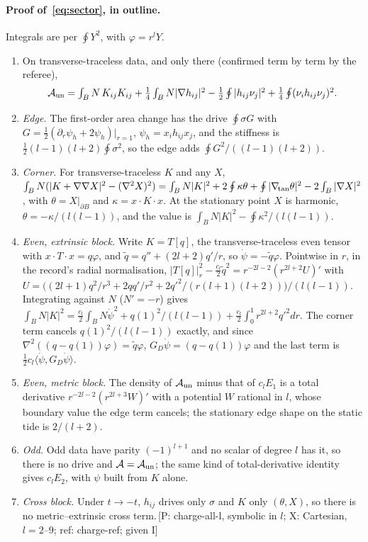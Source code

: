 \documentclass[11pt]{article}
\newcommand{\cA}{\mathcal{A}}
\newcommand{\GD}{G_{\!D}}
\newcommand{\ip}[2]{\langle #1,#2\rangle}
\newcommand{\ev}[1]{\,{\textsf{\scriptsize[#1]}}}
\begin{document}
\paragraph{Proof of~\eqref{eq:sector}, in outline.} Integrals are per $\oint Y^2$, with $\varphi=r^lY$.
\begin{enumerate}\itemsep0pt\setlength{\leftmargin}{1.6em}
\item[(i)] On transverse-traceless data, and only there (confirmed term by term by the referee),
\[\textstyle\cA_{\rm un}=\int_BN\,K_{ij}K_{ij}+\frac14\int_BN|\nabla h_{ij}|^2-\frac12\oint|h_{ij}\nu_j|^2+\frac14\oint(\nu_ih_{ij}\nu_j)^2.\]
\item[(ii)] \emph{Edge.} The first-order area change has the drive $\oint\sigma G$ with $G=\frac12(\partial_r\psi_h+2\psi_h)|_{r=1}$, $\psi_h=x_ih_{ij}x_j$, and the stiffness is $\frac12(l-1)(l+2)\oint\sigma^2$, so the edge adds $\oint G^2/((l-1)(l+2))$.
\item[(iii)] \emph{Corner.} For transverse-traceless $K$ and any $X$, $\int_BN(|K+\nabla\nabla X|^2-(\nabla^2X)^2)=\int_BN|K|^2+2\oint\kappa\theta+\oint|\nabla_{\!\rm tan}\theta|^2-2\int_B|\nabla X|^2$, with $\theta=X|_{\partial B}$ and $\kappa=x\!\cdot\!K\!\cdot\!x$. At the stationary point $X$ is harmonic, $\theta=-\kappa/(l(l-1))$, and the value is $\int_BN|K|^2-\oint\kappa^2/(l(l-1))$.
\item[(iv)] \emph{Even, extrinsic block.} Write $K=T[q]$, the transverse-traceless even tensor with $x\!\cdot\!T\!\cdot\!x=q\varphi$, and $\tilde q=q''+(2l+2)q'/r$, so $\dot\psi=-\tilde q\varphi$. Pointwise in $r$, in the record's radial normalisation, $|T[q]|^2_r-\frac{c_l}2\tilde q^2=r^{-2l-2}(r^{2l+2}U)'$ with $U=\bigl((2l+1)q^2/r^3+2qq'/r^2+2q'^2/(r(l+1)(l+2))\bigr)/(l(l-1))$. Integrating against $N$ ($N'=-r$) gives $\int_BN|K|^2=\frac{c_l}2\int_BN\dot\psi^2+q(1)^2/(l(l-1))+\frac{c_l}2\int_0^1r^{2l+2}q'^2dr$. The corner term cancels $q(1)^2/(l(l-1))$ exactly, and since $\nabla^2((q-q(1))\varphi)=\tilde q\varphi$, $\GD\dot\psi=(q-q(1))\varphi$ and the last term is $\frac12c_l\ip{\dot\psi}{\GD\dot\psi}$.
\item[(v)] \emph{Even, metric block.} The density of $\cA_{\rm un}$ minus that of $c_lE_1$ is a total derivative $r^{-2l-2}(r^{2l+3}W)'$ with a potential $W$ rational in $l$, whose boundary value the edge term cancels; the stationary edge shape on the static tide is $2/(l+2)$.
\item[(vi)] \emph{Odd.} Odd data have parity $(-1)^{l+1}$ and no scalar of degree $l$ has it, so there is no drive and $\cA=\cA_{\rm un}$; the same kind of total-derivative identity gives $c_lE_2$, with $\psi$ built from $K$ alone.
\item[(vii)] \emph{Cross block.} Under $t\to-t$, $h_{ij}$ drives only $\sigma$ and $K$ only $(\theta,X)$, so there is no metric--extrinsic cross term.\ev{P: charge-all-l, symbolic in $l$; X: Cartesian, $l=2$--$9$; ref: charge-ref; given I}
\end{enumerate}
\end{document}
